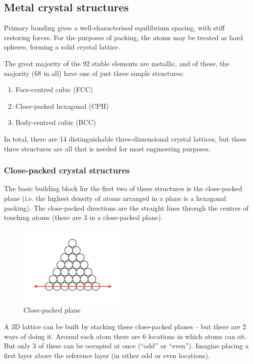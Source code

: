 \documentclass{article}
\begin{document}
\newpage

\subsection{Metal crystal structures}

Primary bonding gives a well-characterised equilibrium spacing, with stiff restoring forces. For the
purposes of packing, the atoms may be treated as hard spheres, forming a solid crystal lattice.

The great majority of the 92 stable elements are metallic, and of these, the majority (68 in all) have one of
just three simple structures: 

\begin{enumerate}
    \item Face-centred cubic (FCC)
    \item Close-packed hexagonal (CPH)
    \item Body-centred cubic (BCC)
\end{enumerate}

In total, there are 14 distinguishable three-dimensional crystal lattices, but these three structures are all that is needed for most engineering purposes.

\subsubsection{Close-packed crystal structures}

The basic building block for the first two of these structures is the
close-packed plane (i.e. the highest density of atoms arranged in a
plane is a hexagonal packing).
The close-packed directions are the straight lines through the centres
of touching atoms (there are 3 in a close-packed plane).

\begin{figure}[h]
    \centering
    \includegraphics{images/mat1.png}
    \caption{Close-packed plane}
    \label{fig:enter-label}
\end{figure}

A 3D lattice can be built by stacking these close-packed planes – but there are 2 ways of doing it.
Around each atom there are 6 locations in which atoms can sit.
But only 3 of these can be occupied at once (“odd” or “even”).
Imagine placing a first layer above the reference layer (in either odd
or even locations). 
\end{document}
